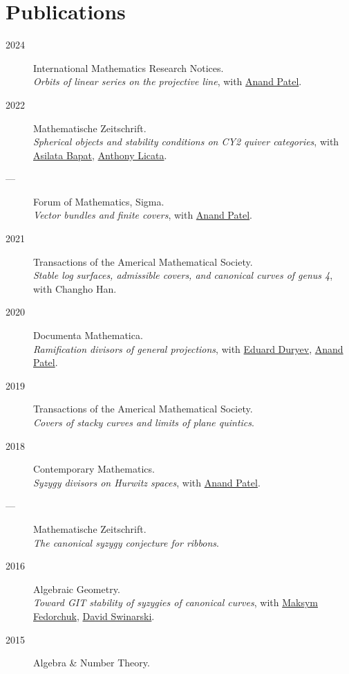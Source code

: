 \documentclass[11pt]{article}
\begin{document}
\section*{Publications}
\label{sec:org47c3822}
\label{org48559c8}
\begin{description}
\item[{2024}] International Mathematics Research Notices.\\
\emph{Orbits of linear series on the projective line}, with \href{https://sites.google.com/view/anand-patel}{Anand Patel}.
\item[{2022}] Mathematische Zeitschrift.\\
\emph{Spherical objects and stability conditions on CY2 quiver categories}, with \href{https://asilata.org/}{Asilata Bapat}, \href{https://maths-people.anu.edu.au/\~licatat/}{Anthony Licata}.
\item[{---}] Forum of Mathematics, Sigma.\\
\emph{Vector bundles and finite covers}, with \href{https://sites.google.com/view/anand-patel}{Anand Patel}.
\item[{2021}] Transactions of the Americal Mathematical Society.\\
\emph{Stable log surfaces, admissible covers, and canonical curves of genus 4}, with Changho Han.
\item[{2020}] Documenta Mathematica.\\
\emph{Ramification divisors of general projections}, with \href{https://eduryev.weebly.com/}{Eduard Duryev}, \href{https://sites.google.com/view/anand-patel}{Anand Patel}.
\item[{2019}] Transactions of the Americal Mathematical Society.\\
\emph{Covers of stacky curves and limits of plane quintics}.
\item[{2018}] Contemporary Mathematics.\\
\emph{Syzygy divisors on Hurwitz spaces}, with \href{https://sites.google.com/view/anand-patel}{Anand Patel}.
\item[{---}] Mathematische Zeitschrift.\\
\emph{The canonical syzygy conjecture for ribbons}.
\item[{2016}] Algebraic Geometry.\\
\emph{Toward GIT stability of syzygies of canonical curves}, with \href{https://www2.bc.edu/maksym-fedorchuk/}{Maksym Fedorchuk}, \href{http://faculty.fordham.edu/dswinarski/}{David Swinarski}.
\item[{2015}] Algebra \& Number Theory.\\

\end{description}
\end{document}
